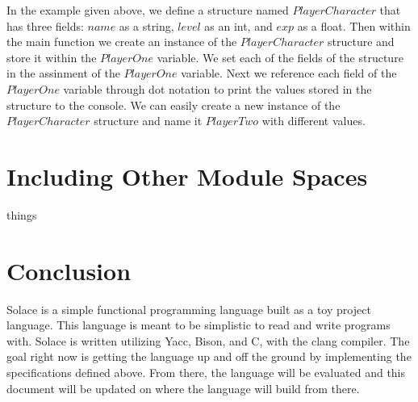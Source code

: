 \documentclass{article}
\begin{document}
In the example given above, we define a structure named $PlayerCharacter$ that has three fields: $name$ as a string, $level$ as an int, and $exp$
as a float. Then within the main function we create an instance of the $PlayerCharacter$ structure and store it within the $PlayerOne$ variable.
We set each of the fields of the structure in the assinment of the $PlayerOne$ variable. Next we reference each field of the $PlayerOne$ variable
through dot notation to print the values stored in the structure to the console. We can easily create a new instance of the $PlayerCharacter$ structure
and name it $PlayerTwo$ with different values.


\section{Including Other Module Spaces}

things


\section{Conclusion}

Solace is a simple functional programming language built as a toy project language. This language is meant to be simplistic to read and write programs with.
Solace is written utilizing Yacc, Bison, and C, with the clang compiler. The goal right now is getting the language up and off the ground by implementing the
specifications defined above. From there, the language will be evaluated and this document will be updated on where the language will build from there.
\end{document}
